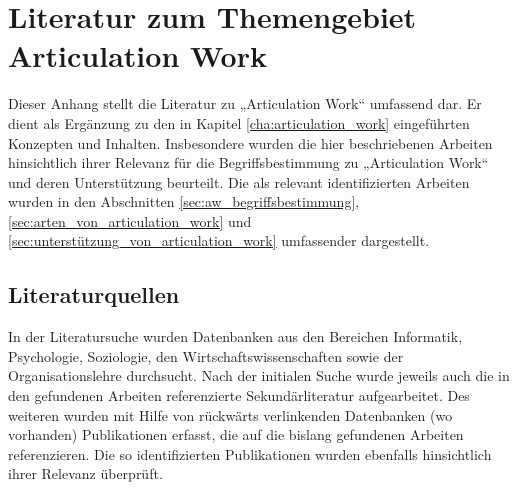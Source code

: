 
\chapter{Literatur zum Themengebiet Articulation Work} %
\label{cha:literatur_zum_themengebiet_articulation_work}

Dieser Anhang stellt die Literatur zu „Articulation Work“ umfassend dar. Er dient als Ergänzung zu den in Kapitel \ref{cha:articulation_work} eingeführten Konzepten und Inhalten. Insbesondere wurden die hier beschriebenen Arbeiten hinsichtlich ihrer Relevanz für die Begriffsbestimmung zu „Articulation Work“ und deren Unterstützung beurteilt. Die als relevant identifizierten Arbeiten wurden in den Abschnitten \ref{sec:aw_begriffsbestimmung}, \ref{sec:arten_von_articulation_work} und \ref{sec:unterstützung_von_articulation_work} umfassender dargestellt.

\section{Literaturquellen} %
\label{sec:literaturquellen}

In der Literatursuche wurden Datenbanken aus den Bereichen Informatik, Psychologie, Soziologie, den Wirtschaftswissenschaften sowie der Organisationslehre durchsucht. Nach der initialen Suche wurde jeweils auch die in den gefundenen Arbeiten referenzierte Sekundärliteratur aufgearbeitet. Des weiteren wurden mit Hilfe von rückwärts verlinkenden Datenbanken (wo vorhanden) Publikationen erfasst, die auf die bislang gefundenen Arbeiten referenzieren. Die so identifizierten Publikationen wurden ebenfalls hinsichtlich ihrer Relevanz überprüft.

